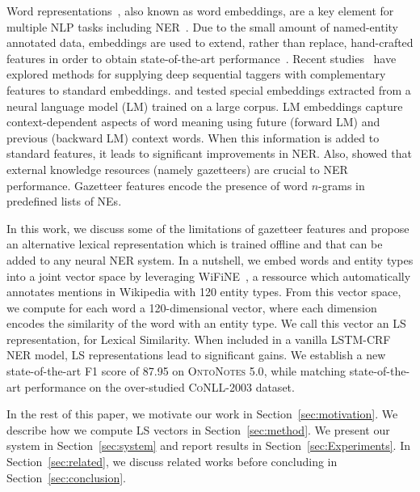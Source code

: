 \documentclass[11pt]{article}
\newcommand{\conll}{\textsc{CoNLL}}
\newcommand{\onto}{\textsc{OntoNotes}}
\newcommand{\lr}{\textsc{LS}}
\newcommand{\wifine}{WiFiNE}
\newcommand{\felipe}[2]{}
\begin{document}
	Word representations~\cite{turian2010word,mikolov2013distributed}, also known as word embeddings, are a key element for multiple NLP tasks including NER~\cite{collobert2011natural}. Due to the small amount of named-entity annotated data, embeddings are used to extend, rather than replace, hand-crafted features in order to obtain state-of-the-art performance~\cite{lample2016neural}. 
	Recent studies~\cite{yang2017neural,sogaard2016deep} have explored methods for supplying deep sequential taggers with complementary features to standard embeddings.  and  tested special embeddings extracted from a neural language model (LM) trained on a large corpus. LM embeddings capture context-dependent aspects of word meaning using future (forward LM) and previous (backward LM) context words. When this information is added to standard features, it leads to significant improvements in NER. 	Also,  showed that external knowledge resources (namely gazetteers) are crucial to NER performance. Gazetteer features encode the presence of word $n$-grams in predefined lists of NEs. 
	
	In this work, we discuss some of the limitations of gazetteer features and propose an alternative lexical representation which is trained offline and that can  be added to any neural NER system. In a nutshell, we embed words and entity types into a joint vector space by leveraging  \wifine~\cite{ghaddara2018wifine}, a ressource which automatically annotates mentions in Wikipedia with 120 entity types. From  this vector space, we compute for each word a  120-dimensional vector, where each dimension encodes the similarity of the word with an entity type. We call this vector an \lr{} representation, for Lexical Similarity. When included in a vanilla LSTM-CRF NER model, \lr{} representations lead to significant gains.  We establish a new state-of-the-art F1 score of  87.95 on \onto{ 5.0}, while matching state-of-the-art performance on the over-studied \conll{-2003} dataset. \felipe{, without making use of LM embeddings as features.}{Unsure this is claim you want to make: because it raises the question: why the hell not?}

	
	In the rest of this paper, we motivate our work in Section~\ref{sec:motivation}. We describe how we compute \lr{} vectors in Section~\ref{sec:method}. We present our system in Section~\ref{sec:system} and report results in Section~\ref{sec:Experiments}. In Section~\ref{sec:related}, we discuss related works before concluding in Section~\ref{sec:conclusion}.
	
\end{document}
